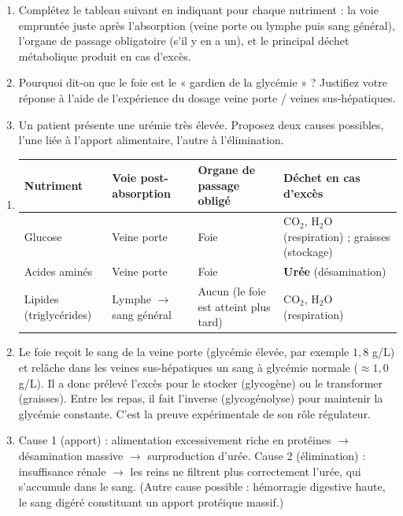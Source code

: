\documentclass[11pt]{article}
\begin{document}
\begin{exercice}
\begin{enumerate}
    \item Complétez le tableau suivant en indiquant pour chaque nutriment : la voie empruntée juste après l'absorption (veine porte ou lymphe puis sang général), l'organe de passage obligatoire (s'il y en a un), et le principal déchet métabolique produit en cas d'excès.
    \item Pourquoi dit-on que le foie est le « gardien de la glycémie » ? Justifiez votre réponse à l'aide de l'expérience du dosage veine porte / veines sus-hépatiques.
    \item Un patient présente une urémie très élevée. Proposez deux causes possibles, l'une liée à l'apport alimentaire, l'autre à l'élimination.
\end{enumerate}
\end{exercice}

\begin{corrige}
\begin{enumerate}
    \item
    \begin{center}
    \begin{tabularx}{\linewidth}{|l|X|X|X|}\hline
    \rowcolor{popblueL}
    \textbf{Nutriment} & \textbf{Voie post-absorption} & \textbf{Organe de passage obligé} & \textbf{Déchet en cas d'excès} \\ \hline
    Glucose & Veine porte & Foie & CO$_2$, H$_2$O (respiration) ; graisses (stockage) \\ \hline
    Acides aminés & Veine porte & Foie & \textbf{Urée} (désamination) \\ \hline
    Lipides (triglycérides) & Lymphe $\rightarrow$ sang général & Aucun (le foie est atteint plus tard) & CO$_2$, H$_2$O (respiration) \\ \hline
    \end{tabularx}
    \end{center}
    \item Le foie reçoit le sang de la veine porte (glycémie élevée, par exemple $1,8$ g/L) et relâche dans les veines sus-hépatiques un sang à glycémie normale ($\approx 1,0$ g/L). Il a donc prélevé l'excès pour le stocker (glycogène) ou le transformer (graisses). Entre les repas, il fait l'inverse (glycogénolyse) pour maintenir la glycémie constante. C'est la preuve expérimentale de son rôle régulateur.
    \item Cause 1 (apport) : alimentation excessivement riche en protéines $\rightarrow$ désamination massive $\rightarrow$ surproduction d'urée. Cause 2 (élimination) : insuffisance rénale $\rightarrow$ les reins ne filtrent plus correctement l'urée, qui s'accumule dans le sang. (Autre cause possible : hémorragie digestive haute, le sang digéré constituant un apport protéique massif.)
\end{enumerate}
\end{corrige}
\end{document}
